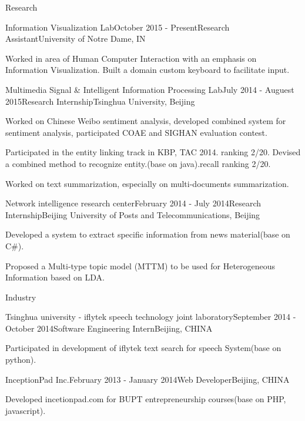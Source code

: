 \documentclass{resume} %
\begin{document}
\begin{rSection}{Research}

\begin{rSubsection}{Information Visualization Lab}{October 2015 - Present}{Research Assistant}{University of Notre Dame, IN}
\item Worked in area of Human Computer Interaction with an emphasis on Information Visualization. Built a domain custom keyboard to facilitate input.
\end{rSubsection}


\begin{rSubsection}{Multimedia Signal \& Intelligent Information Processing Lab}{July 2014 - Auguest 2015}{Research Internship}{Tsinghua University, Beijing}
\item Worked on Chinese Weibo sentiment analysis, developed combined system for sentiment analysis, participated COAE and SIGHAN evaluation contest.
\item Participated in the entity linking track in KBP, TAC 2014. ranking 2/20. Devised a combined method to recognize entity.(base on java).recall ranking 2/20.
\item Worked on text summarization, especially on multi-documents summarization.
\end{rSubsection}


\begin{rSubsection}{Network intelligence research center}{February 2014 - July 2014}{Research Internship}{Beijing University of Posts and Telecommunications, Beijing}
\item Developed a system to extract specific information from news material(base on C\#).
\item Proposed a Multi-type topic model (MTTM) to be used for Heterogeneous Information based on LDA.
\end{rSubsection}

\end{rSection}


\begin{rSection}{Industry}

\begin{rSubsection}{Tsinghua university - iflytek speech technology joint laboratory}{September 2014 - October 2014}{Software Engineering Intern}{Beijing, CHINA}
\item Participated in development of iflytek text search for speech System(base on python).\end{rSubsection}


\begin{rSubsection}{InceptionPad Inc.}{February 2013 - January 2014}{Web Developer}{Beijing, CHINA}
\item Developed incetionpad.com for BUPT entrepreneurship courses(base on PHP, javascript).
\end{rSubsection}


\end{rSection}
\end{document}
